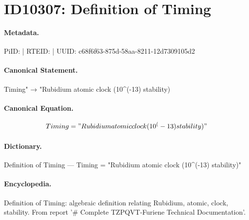 \section*{ID10307: Definition of Timing}
\paragraph{Metadata.}
PiID:  | RTEID:  | UUID: c68f6f63-875d-58aa-8211-12d7309105d2

\paragraph{Canonical Statement.}
Timing" → "Rubidium atomic clock (10\textasciicircum{}(-13) stability)

\paragraph{Canonical Equation.}
\[
Timing = "Rubidium atomic clock (10^(-13) stability)"
\]

\paragraph{Dictionary.}
Definition of Timing — Timing = "Rubidium atomic clock (10\textasciicircum{}(-13) stability)"

\paragraph{Encyclopedia.}
Definition of Timing: algebraic definition relating Rubidium, atomic, clock, stability. From report '\# Complete TZPQVT-Furiene Technical Documentation'.
